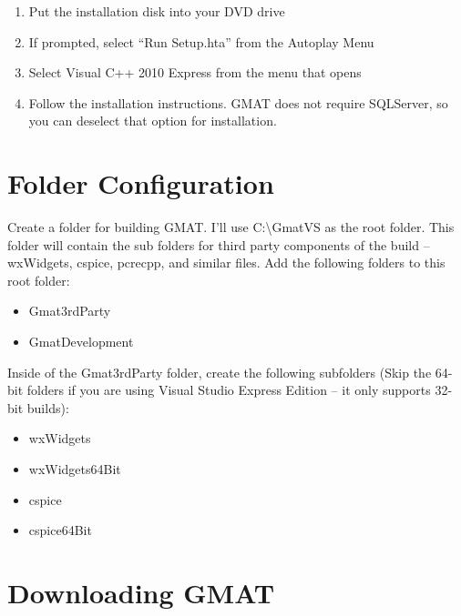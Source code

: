\documentclass[letterpaper,10pt]{article}%
\begin{document}
\begin{enumerate}
\item Put the installation disk into your DVD drive
\item If prompted, select ``Run Setup.hta'' from the Autoplay Menu
\item Select Visual C++ 2010 Express from the menu that opens
\item Follow the installation instructions.  GMAT does not require SQLServer, so you can deselect that option for installation.
\end{enumerate}

\section{Folder Configuration}

Create a folder for building GMAT.  I'll use C:\textbackslash GmatVS as the root folder.  This folder will contain the sub folders for third party components of the build -- wxWidgets, cspice, pcrecpp, and similar files.  Add the following folders to this root folder:
\begin{itemize}
\item Gmat3rdParty
\item GmatDevelopment
\end{itemize}

Inside of the Gmat3rdParty folder, create the following subfolders (Skip the 64-bit folders if you are using Visual Studio Express Edition -- it only supports 32-bit builds):
\begin{itemize}
\item wxWidgets
\item wxWidgets64Bit
\item cspice
\item cspice64Bit
\end{itemize}

\section{Downloading GMAT}
\end{document}
